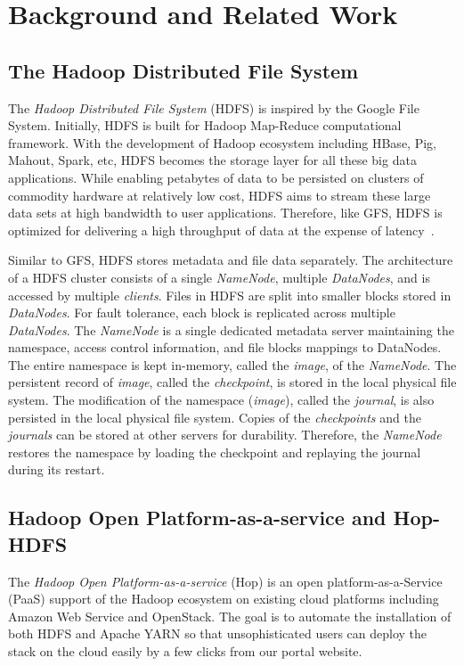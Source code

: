 \documentclass[runningheads,a4paper]{llncs}
\begin{document}
\section{Background and Related Work}
\subsection{The Hadoop Distributed File System}
The \textit{Hadoop Distributed File System} (HDFS) is inspired by the Google File System. Initially, HDFS is built for Hadoop Map-Reduce computational framework. With the development of Hadoop ecosystem including HBase, Pig, Mahout, Spark, etc, HDFS becomes the storage layer for all these big data applications. While enabling petabytes of data to be persisted on clusters of commodity hardware at relatively low cost, HDFS aims to stream these large data sets at high bandwidth to user applications. Therefore, like GFS, HDFS is optimized for delivering a high throughput of data at the expense of latency~\cite{white2012hadoop}.

Similar to GFS, HDFS stores metadata and file data separately. The architecture of a HDFS cluster consists of a single \textit{NameNode}, multiple \textit{DataNodes}, and is accessed by multiple \textit{clients}. Files in HDFS are split into smaller blocks stored in \textit{DataNodes}. For fault tolerance, each block is replicated across multiple \textit{DataNodes}. The \textit{NameNode} is a single dedicated metadata server maintaining the namespace, access control information, and file blocks mappings to DataNodes. The entire namespace is kept in-memory, called the \textit{image}, of the \textit{NameNode}. The persistent record of \textit{image}, called the \textit{checkpoint}, is stored in the local physical file system. The modification of the namespace (\textit{image}), called the \textit{journal}, is also persisted in the local physical file system. Copies of the \textit{checkpoints} and the \textit{journals} can be stored at other servers for durability. Therefore, the \textit{NameNode} restores the namespace by loading the checkpoint and replaying the journal during its restart.

\subsection{Hadoop Open Platform-as-a-service and Hop-HDFS}
The \textit{Hadoop Open Platform-as-a-service} (Hop) is an open platform-as-a-Service (PaaS) support of the Hadoop ecosystem on existing cloud platforms including Amazon Web Service and OpenStack. The goal is to automate the installation of both HDFS and Apache YARN so that unsophisticated users can deploy the stack on the cloud easily by a few clicks from our portal website. 
\end{document}
